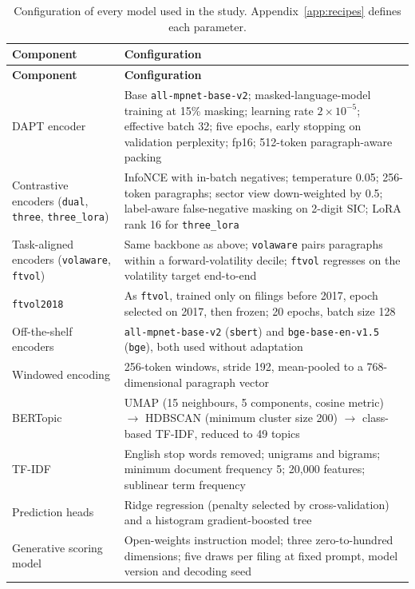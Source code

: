 \documentclass[logo,msc,ai]{infthesis}        %
\begin{document}
{\footnotesize
\begin{longtable}{@{}L{3.0cm}L{11.0cm}@{}}
\caption{Configuration of every model used in the study. Appendix~\ref{app:recipes} defines each parameter.}
\label{tab:configs}\\
\toprule
\textbf{Component} & \textbf{Configuration} \\
\midrule
\endfirsthead
\toprule
\textbf{Component} & \textbf{Configuration} \\
\midrule
\endhead
\bottomrule
\endfoot
\bottomrule
\endlastfoot
DAPT encoder & Base \texttt{all-mpnet-base-v2}; masked-language-model training at 15\% masking; learning rate $2\times10^{-5}$; effective batch 32; five epochs, early stopping on validation perplexity; fp16; 512-token paragraph-aware packing \\
Contrastive encoders (\texttt{dual}, \texttt{three}, \texttt{three\_lora}) & InfoNCE with in-batch negatives; temperature 0.05; 256-token paragraphs; sector view down-weighted by 0.5; label-aware false-negative masking on 2-digit SIC; LoRA rank 16 for \texttt{three\_lora} \\
Task-aligned encoders (\texttt{volaware}, \texttt{ftvol}) & Same backbone as above; \texttt{volaware} pairs paragraphs within a forward-volatility decile; \texttt{ftvol} regresses on the volatility target end-to-end \\
\texttt{ftvol2018} & As \texttt{ftvol}, trained only on filings before 2017, epoch selected on 2017, then frozen; 20 epochs, batch size 128 \\
Off-the-shelf encoders & \texttt{all-mpnet-base-v2} (\texttt{sbert}) and \texttt{bge-base-en-v1.5} (\texttt{bge}), both used without adaptation \\
Windowed encoding & 256-token windows, stride 192, mean-pooled to a 768-dimensional paragraph vector \\
BERTopic & UMAP (15 neighbours, 5 components, cosine metric) $\rightarrow$ HDBSCAN (minimum cluster size 200) $\rightarrow$ class-based TF-IDF, reduced to 49 topics \\
TF-IDF & English stop words removed; unigrams and bigrams; minimum document frequency 5; 20{,}000 features; sublinear term frequency \\
Prediction heads & Ridge regression (penalty selected by cross-validation) and a histogram gradient-boosted tree \\
Generative scoring model & Open-weights instruction model; three zero-to-hundred dimensions; five draws per filing at fixed prompt, model version and decoding seed \\
\end{longtable}
}
\end{document}
